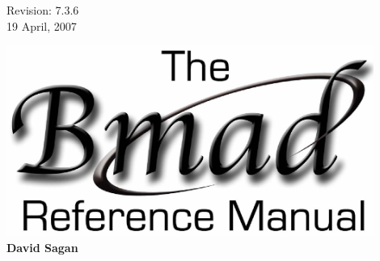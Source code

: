 \thispagestyle{empty}

\begin{flushright}
\large
  Revision: 7.3.6 \\
  19 April, 2007 \\
\end{flushright}

\vfill

{
\begin{center}
\includegraphics[width=12cm]{bmad-ref-manual.eps} \\
\vskip 0.3in
\huge\bf David Sagan
\end{center}
}

\vfill
\break
